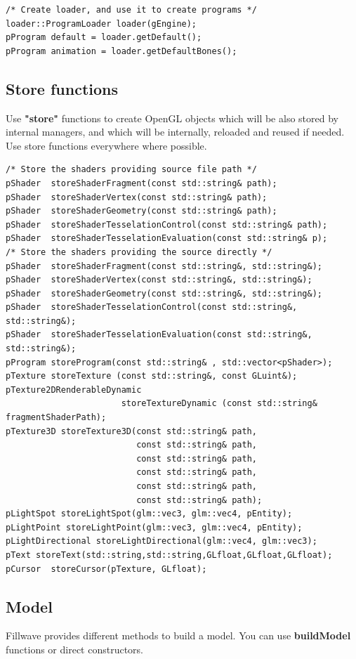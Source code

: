 \documentclass{article}
\begin{document}
\begin{lstlisting}
/* Create loader, and use it to create programs */
loader::ProgramLoader loader(gEngine);
pProgram default = loader.getDefault();
pProgram animation = loader.getDefaultBones();
\end{lstlisting}

\subsection{Store functions}\label{sec:store functions}
\indent \indent Use \textbf{"store"} functions to create OpenGL objects which will be also stored by internal managers, and which will be internally, reloaded and reused if needed. Use store functions everywhere where possible.

\begin{lstlisting}
/* Store the shaders providing source file path */
pShader  storeShaderFragment(const std::string& path);
pShader  storeShaderVertex(const std::string& path);
pShader  storeShaderGeometry(const std::string& path);
pShader  storeShaderTesselationControl(const std::string& path);
pShader  storeShaderTesselationEvaluation(const std::string& p);
/* Store the shaders providing the source directly */
pShader  storeShaderFragment(const std::string&, std::string&);
pShader  storeShaderVertex(const std::string&, std::string&);
pShader  storeShaderGeometry(const std::string&, std::string&);
pShader  storeShaderTesselationControl(const std::string&, std::string&);
pShader  storeShaderTesselationEvaluation(const std::string&, std::string&);
pProgram storeProgram(const std::string& , std::vector<pShader>);
pTexture storeTexture (const std::string&, const GLuint&);
pTexture2DRenderableDynamic 
                       storeTextureDynamic (const std::string& fragmentShaderPath);
pTexture3D storeTexture3D(const std::string& path,
                          const std::string& path,
                          const std::string& path,
                          const std::string& path,
                          const std::string& path,
                          const std::string& path);
pLightSpot storeLightSpot(glm::vec3, glm::vec4, pEntity);
pLightPoint storeLightPoint(glm::vec3, glm::vec4, pEntity);
pLightDirectional storeLightDirectional(glm::vec4, glm::vec3);
pText storeText(std::string,std::string,GLfloat,GLfloat,GLfloat);
pCursor  storeCursor(pTexture, GLfloat);
\end{lstlisting}

\newpage

\subsection{Model}\label{sec:Model}
\indent \indent Fillwave provides different methods to build a model. You can use \textbf{buildModel} functions or direct constructors.
\end{document}

